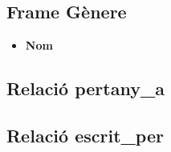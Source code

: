 \subsection{Frame Gènere}

\begin{itemize}
\item \textbf{Nom}
\end{itemize}

\subsection{Relació pertany_a}

\subsection{Relació escrit_per}

